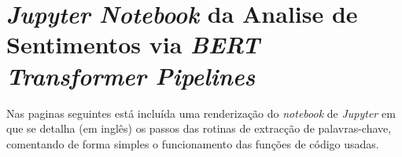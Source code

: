 \chapter{\textit{Jupyter Notebook} da Analise de Sentimentos via \textit{BERT Transformer Pipelines}}
\label{ap3}


Nas paginas seguintes está incluída uma renderização do \textit{notebook} de \textit{Jupyter} em que se detalha (em inglês) os passos das rotinas de extracção de palavras-chave, comentando de forma simples o funcionamento das funções de código usadas.

